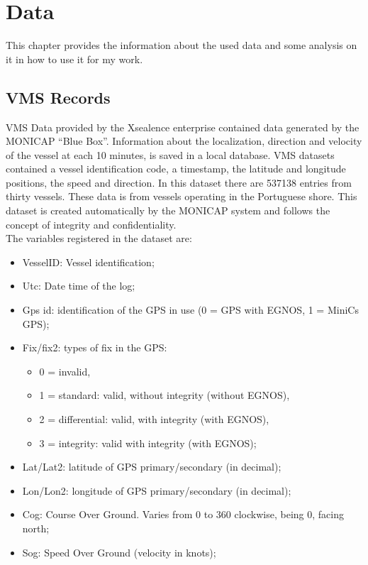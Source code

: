 % 
%  
%
\chapter{Data}
\label{cha:data}
This chapter provides the information about the used data and some analysis on it in how to use it for my work.

\section{VMS Records} %
\label{sec:vms_records}

VMS Data provided by the Xsealence enterprise contained data generated by the MONICAP “Blue Box”. Information about the localization, direction and velocity of the vessel at each 10 minutes, is saved in a local database. VMS datasets contained a vessel identification code, a timestamp, the latitude and longitude positions, the speed and direction. In this dataset there are 537138 entries from thirty vessels. These data is from vessels operating in the Portuguese shore.  
This dataset is created automatically by the MONICAP system and follows the concept of integrity and confidentiality.\\
The variables registered in the dataset are:
\begin{itemize}
\item VesselID: Vessel identification;
\item	Utc: Date time of the log;
\item	Gps \textemdash id: identification of the GPS in use (0 = GPS with EGNOS, 1 = MiniCs GPS);
\item	Fix/fix2: types of fix in the GPS:
\begin{itemize}
\item	0 = invalid, 
\item	1 = standard: valid, without integrity (without EGNOS), 
\item	2 = differential: valid, with integrity (with EGNOS), 
\item	3 = integrity: valid with integrity (with EGNOS);
\end{itemize}
\item	Lat/Lat2: latitude of GPS primary/secondary (in decimal);
\item	Lon/Lon2: longitude of GPS primary/secondary (in decimal);
\item	Cog: Course Over Ground. Varies from 0 to 360 clockwise, being 0, facing north;
\item	Sog: Speed Over Ground (velocity in knots);


\end{itemize}

